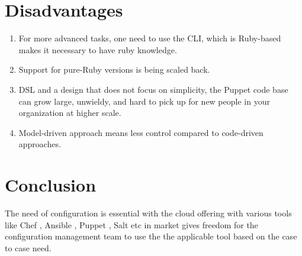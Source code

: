 \documentclass[9pt,twocolumn,twoside]{styles/osajnl}
\begin{document}
\section{Disadvantages}

\begin{enumerate}

\item For more advanced tasks, one need to use the CLI, which is
Ruby-based makes it necessary to have ruby knowledge.
\item Support for pure-Ruby versions is being scaled back.
\item DSL and a design that does not focus on
simplicity, the Puppet code base can grow large, unwieldy, and hard to
pick up for new people in your organization at higher scale.
\item Model-driven approach means less control compared to code-driven
approaches.\cite{www-intigue} 

\end{enumerate}

\section{Conclusion}

The need of configuration is essential with the cloud offering with
various tools like Chef , Ansible , Puppet , Salt etc in market gives
freedom for the configuration management team to use the the
applicable tool based on the case to case need.





 

\newpage

\appendix
\end{document}
